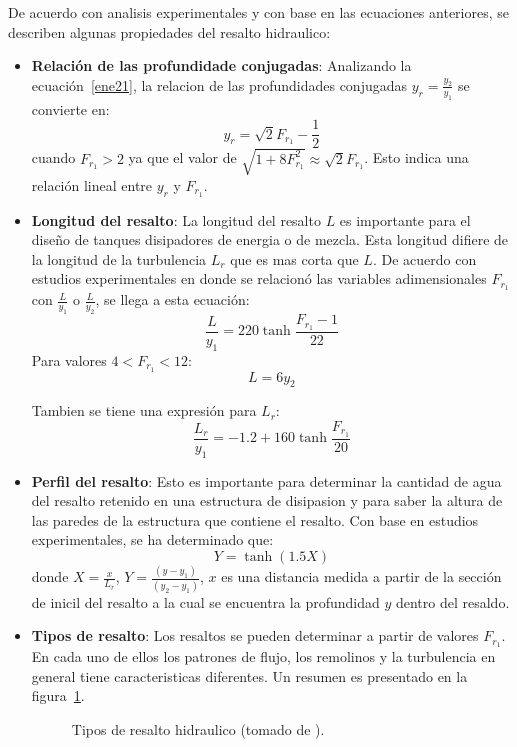 \documentclass[11pt, oneside]{article}
\begin{document}
De acuerdo con analisis experimentales y con base en las ecuaciones anteriores, se describen algunas propiedades del resalto hidraulico:
\begin{itemize}
\item \textbf{Relaci\'on de las profundidade conjugadas}: Analizando la ecuaci\'on~\ref{ene21}, la relacion de las profundidades conjugadas $y_r = \frac{y_2}{y_1}$ se convierte en:
$$
y_r = \sqrt{2} F_{r_1} - \frac{1}{2}
$$
cuando $F_{r_1} > 2$ ya que el valor de $\sqrt{1+8F_{r_1}^2} \approx \sqrt{2} F_{r_1}$. Esto indica una relaci\'on lineal entre $y_r$ y $F_{r_1}$.

\item \textbf{Longitud del resalto}: La longitud del resalto $L$ es importante para el diseño de tanques disipadores de energia o de mezcla. Esta longitud difiere de la longitud de la turbulencia $L_r$ que es mas corta que $L$. De acuerdo con estudios experimentales en donde se relacion\'o las variables adimensionales $F_{r_1}$ con $\frac{L}{y_1}$ o $\frac{L}{y_2}$, se llega a esta ecuaci\'on:
$$
\frac{L}{y_1} = 220 \tanh \frac{F_{r_1}-1}{22}
$$
Para valores $4 < F_{r_1} < 12$:
$$
L = 6 y_2
$$

Tambien se tiene una expresi\'on para $L_r$:
$$
\frac{L_r}{y_1} = -1.2 + 160 \tanh \frac{F_{r_1}}{20}
$$

\item \textbf{Perfil del resalto}: Esto es importante para determinar la cantidad de agua del resalto retenido en una estructura de disipasion y para saber la altura de las paredes de la estructura que contiene el resalto. Con base en estudios experimentales, se ha determinado que:
$$
Y = \tanh (1.5 X)
$$
donde $X=\frac{x}{L_r}$, $Y=\frac{(y - y_1)}{( y_2 - y_1)}$, $x$ es una  distancia medida a partir de la secci\'on de inicil del resalto a la cual se encuentra la profundidad $y$ dentro del resaldo.

\item \textbf{Tipos de resalto}: Los resaltos se pueden determinar a partir de valores $F_{r_1}$. En cada uno de ellos los patrones de flujo, los remolinos y la turbulencia en general tiene caracteristicas diferentes. Un resumen es presentado en la figura~\ref{fig15}.

\begin{figure}[h]
\centering
\caption{Tipos de resalto hidraulico (tomado de \cite{Chau}).}
\label{fig15}
\end{figure}


\end{itemize}
\end{document}

